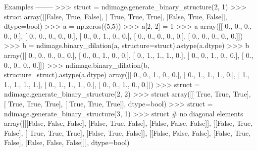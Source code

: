 \begin{DoxyVerb}
Examples
--------
>>> struct = ndimage.generate_binary_structure(2, 1)
>>> struct
array([[False,  True, False],
       [ True,  True,  True],
       [False,  True, False]], dtype=bool)
>>> a = np.zeros((5,5))
>>> a[2, 2] = 1
>>> a
array([[ 0.,  0.,  0.,  0.,  0.],
       [ 0.,  0.,  0.,  0.,  0.],
       [ 0.,  0.,  1.,  0.,  0.],
       [ 0.,  0.,  0.,  0.,  0.],
       [ 0.,  0.,  0.,  0.,  0.]])
>>> b = ndimage.binary_dilation(a, structure=struct).astype(a.dtype)
>>> b
array([[ 0.,  0.,  0.,  0.,  0.],
       [ 0.,  0.,  1.,  0.,  0.],
       [ 0.,  1.,  1.,  1.,  0.],
       [ 0.,  0.,  1.,  0.,  0.],
       [ 0.,  0.,  0.,  0.,  0.]])
>>> ndimage.binary_dilation(b, structure=struct).astype(a.dtype)
array([[ 0.,  0.,  1.,  0.,  0.],
       [ 0.,  1.,  1.,  1.,  0.],
       [ 1.,  1.,  1.,  1.,  1.],
       [ 0.,  1.,  1.,  1.,  0.],
       [ 0.,  0.,  1.,  0.,  0.]])
>>> struct = ndimage.generate_binary_structure(2, 2)
>>> struct
array([[ True,  True,  True],
       [ True,  True,  True],
       [ True,  True,  True]], dtype=bool)
>>> struct = ndimage.generate_binary_structure(3, 1)
>>> struct # no diagonal elements
array([[[False, False, False],
        [False,  True, False],
        [False, False, False]],
       [[False,  True, False],
        [ True,  True,  True],
        [False,  True, False]],
       [[False, False, False],
        [False,  True, False],
        [False, False, False]]], dtype=bool)\end{DoxyVerb}
 \hypertarget{namespacescipy_1_1ndimage_1_1morphology_aca27b5c4bf8c5f31da94b6fe9ed84618}{}

